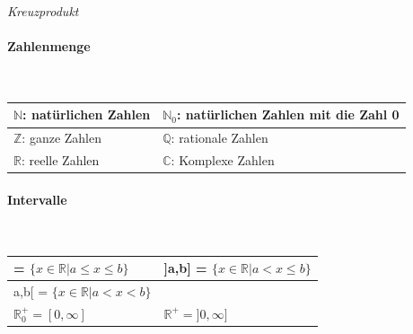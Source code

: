 \noindent
\textit{Kreuzprodukt}\linebreak
{}
\vspace{1mm}

\paragraph{Zahlenmenge}\mbox{}\\
\begin{tabularx}{\columnwidth}{@{}X|X@{}}
    \hline
    $\mathbb{N}$: natürlichen Zahlen & $\mathbb{N}_0$: natürlichen Zahlen mit die Zahl 0 \\ \hline
    $\mathbb{Z}$: ganze Zahlen       & $\mathbb{Q}$: rationale Zahlen                    \\ \hline
    $\mathbb{R}$: reelle Zahlen      & $\mathbb{C}$: Komplexe Zahlen                     \\ \hline
\end{tabularx}
\vspace{1mm}

\paragraph{Intervalle}\mbox{}\\
\begin{tabularx}{\columnwidth}{@{}X|X@{}}
    \hline
    [a,b] = $\{x \in \mathbb{R} | a \leq  x \leq b \}$ & ]a,b] = $\{x \in \mathbb{R} | a < x \leq b \}$ \\ \hline
    [a,b[ = $\{x \in \mathbb{R} | a \leq  x < b \}$    & ]a,b[ = $\{x \in \mathbb{R} | a < x < b \}$    \\ \hline
    $\mathbb{R}^{+}_0 = [0,\infty]$                    & $\mathbb{R}^{+} = ]0,\infty]$                  \\ \hline
\end{tabularx}
\vspace{1mm}

